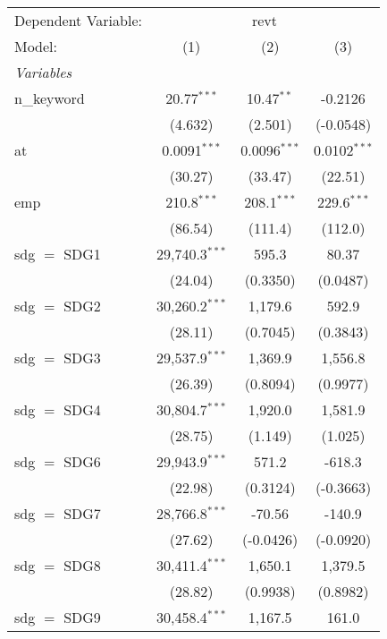 
\begingroup
\centering
\begin{tabular}{lccc}
   \tabularnewline \midrule \midrule
   Dependent Variable: & \multicolumn{3}{c}{revt}\\
   Model:        & (1)              & (2)            & (3)\\  
   \midrule
   \emph{Variables}\\
   n\_keyword    & 20.77$^{***}$    & 10.47$^{**}$   & -0.2126\\   
                 & (4.632)          & (2.501)        & (-0.0548)\\   
   at            & 0.0091$^{***}$   & 0.0096$^{***}$ & 0.0102$^{***}$\\   
                 & (30.27)          & (33.47)        & (22.51)\\   
   emp           & 210.8$^{***}$    & 208.1$^{***}$  & 229.6$^{***}$\\   
                 & (86.54)          & (111.4)        & (112.0)\\   
   sdg $=$ SDG1  & 29,740.3$^{***}$ & 595.3          & 80.37\\   
                 & (24.04)          & (0.3350)       & (0.0487)\\   
   sdg $=$ SDG2  & 30,260.2$^{***}$ & 1,179.6        & 592.9\\   
                 & (28.11)          & (0.7045)       & (0.3843)\\   
   sdg $=$ SDG3  & 29,537.9$^{***}$ & 1,369.9        & 1,556.8\\   
                 & (26.39)          & (0.8094)       & (0.9977)\\   
   sdg $=$ SDG4  & 30,804.7$^{***}$ & 1,920.0        & 1,581.9\\   
                 & (28.75)          & (1.149)        & (1.025)\\   
   sdg $=$ SDG6  & 29,943.9$^{***}$ & 571.2          & -618.3\\   
                 & (22.98)          & (0.3124)       & (-0.3663)\\   
   sdg $=$ SDG7  & 28,766.8$^{***}$ & -70.56         & -140.9\\   
                 & (27.62)          & (-0.0426)      & (-0.0920)\\   
   sdg $=$ SDG8  & 30,411.4$^{***}$ & 1,650.1        & 1,379.5\\   
                 & (28.82)          & (0.9938)       & (0.8982)\\   
   sdg $=$ SDG9  & 30,458.4$^{***}$ & 1,167.5        & 161.0\\   

\end{tabular}
